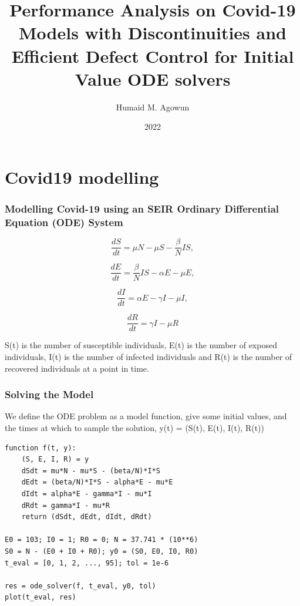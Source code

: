 \documentclass{beamer}
\title{Performance Analysis on Covid-19 Models with Discontinuities and Efficient Defect Control for Initial Value ODE solvers}
\author{Humaid M. Agowun}
\institute{Saint Mary's University}
\date{2022}
\begin{document}
\frame{\titlepage}


\section{Covid19 modelling}
\begin{frame}
\frametitle{Modelling Covid-19 using an SEIR Ordinary Differential Equation (ODE) System}

\begin{equation}
\frac{\textit{d}S}{\textit{dt}} = \mu N - \mu S - \frac{\beta}{N}IS, \nonumber
\end{equation}

\begin{equation}
\frac{\textit{d}E}{\textit{dt}} = \frac{\beta}{N}IS - \alpha E - \mu E, \nonumber
\end{equation}

\begin{equation}
\frac{\textit{d}I}{\textit{dt}} = \alpha E - \gamma I - \mu I, \nonumber
\end{equation}

\begin{equation}
\frac{\textit{d}R}{\textit{dt}} = \gamma I - \mu R \nonumber
\end{equation} 

S(t) is the number of susceptible individuals, 
E(t) is the number of exposed individuals, 
I(t) is the number of infected individuals and 
R(t) is the number of recovered individuals at a point in time. 
\end{frame}

\begin{frame}[fragile]
\frametitle{Solving the Model}
We define the ODE problem as a model function, give some initial values, and the times at which to sample the solution, y(t) = (S(t), E(t), I(t), R(t))

\begin{lstlisting}
function f(t, y):
    (S, E, I, R) = y
    dSdt = mu*N - mu*S - (beta/N)*I*S
    dEdt = (beta/N)*I*S - alpha*E - mu*E
    dIdt = alpha*E - gamma*I - mu*I
    dRdt = gamma*I - mu*R
    return (dSdt, dEdt, dIdt, dRdt)

E0 = 103; I0 = 1; R0 = 0; N = 37.741 * (10**6)
S0 = N - (E0 + I0 + R0); y0 = (S0, E0, I0, R0)
t_eval = [0, 1, 2, ..., 95]; tol = 1e-6

res = ode_solver(f, t_eval, y0, tol)
plot(t_eval, res)
\end{lstlisting}
\end{frame}
\end{document}
